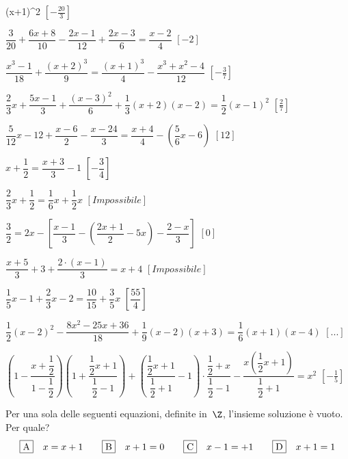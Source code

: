 \begin{esercizio}[*]
\begin{enumeratea}
        \left(x+1\right)^{2}\)
  \hfill \(\left[-{\frac{20}{3}}\right]\)
 \item \(\dfrac{3}{20}+\dfrac{6x+8}{10}-\dfrac{2x-1}{12}+\dfrac{2x-3}{6}=
        \dfrac{x-2}{4}\)
  \hfill \(\left[-2\right]\)
 \item \(\dfrac{x^{3}-1}{18}+\dfrac{(x+2)^{3}}{9}=
        \dfrac{(x+1)^{3}}{4}-\dfrac{x^{3}+x^{2}-4}{12}\)
  \hfill \(\left[-{\frac{3}{7}}\right]\)
 \item \(\dfrac{2}{3}x+\dfrac{5x-1}{3}+\dfrac{(x-3)^{2}}{6}+
        \dfrac{1}{3}(x+2)(x-2)=\dfrac{1}{2}(x-1)^{2}\)
  \hfill \(\left[\frac{2}{7}\right]\)
 \item \(\dfrac{5}{12}x-12+\dfrac{x-6}{2}-\dfrac{x-24}{3}=
        \dfrac{x+4}{4}-\left(\dfrac{5}{6}x-6\right)\)
  \hfill \(\left[12\right]\)
 \item \(x+\dfrac{1}{2}=\dfrac{x+3}{3}-1\)
  \hfill \(\left[-\dfrac{3}{4}\right]\)
 \item \(\dfrac{2}{3}x+\dfrac{1}{2}=\dfrac{1}{6}x+\dfrac{1}{2}x\)
  \hfill \(\left[Impossibile\right]\)
 \item \(\dfrac{3}{2}=2x-\left[\dfrac{x-1}{3}-
        \left(\dfrac{2x+1}{2}-5x\right)-\dfrac{2-x}{3}\right]\)
  \hfill \(\left[0\right]\)
 \item \(\dfrac{x+5}{3}+3+\dfrac{2\cdot \left(x-1\right)}{3}=x+4\)
  \hfill \(\left[Impossibile\right]\)
 \item \(\dfrac{1}{5}x-1+\dfrac{2}{3}x-2=\dfrac{10}{15}+\dfrac{3}{5}x\)
  \hfill \(\left[\dfrac{55}{4}\right]\)
 \item 
\(\dfrac{1}{2}(x-2)^{2}-\dfrac{8x^{2}-25x+36}{18}+\dfrac{1}{9}(x-2)(x+3)=
        \dfrac{1}{6}(x+1)(x-4)\)
  \hfill \(\left[...\right]\)
 \item \(\left(1-\dfrac{x+\dfrac{1}{2}}{1-\dfrac{1}{2}}\right)
        \left(1+\dfrac{\dfrac{1}{2}x+1}{\dfrac{1}{2}-1}\right)+
        \left(\dfrac{\dfrac{1}{2}x+1}{\dfrac{1}{2}+1}-1\right)\cdot 
        {\dfrac{\dfrac{1}{2}+x}{\dfrac{1}{2}-1}}-
        \dfrac{x\left(\dfrac{1}{2}x+1\right)}{\dfrac{1}{2}+1}=x^{2}\)
  \hfill \(\left[-{\frac{1}{5}}\right]\)
\end{enumeratea}
\end{esercizio}

\begin{esercizio}
\label{ese:13.44}
Per una sola delle seguenti equazioni, definite in~\(\Z\), l'insieme 
soluzione 
è vuoto. Per quale?
\[\fbox{A}\quad x=x+1\qquad\fbox{B}\quad x+1=0\qquad\fbox{C}\quad x-1=+1\qquad\fbox{D}\quad 
x+1=1\]
\end{esercizio}

